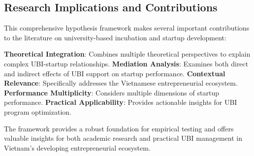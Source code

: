 \documentclass[../Main.tex]{subfiles}
\begin{document}
    \subsection{Research Implications and Contributions}
    This comprehensive hypothesis framework makes several important contributions to the literature on university-based incubation and startup development:

    \textbf{Theoretical Integration}: Combines multiple theoretical perspectives to explain complex UBI-startup relationships. 
    \textbf{Mediation Analysis}: Examines both direct and indirect effects of UBI support on startup performance. 
    \textbf{Contextual Relevance}: Specifically addresses the Vietnamese entrepreneurial ecosystem. 
    \textbf{Performance Multiplicity}: Considers multiple dimensions of startup performance. 
    \textbf{Practical Applicability}: Provides actionable insights for UBI program optimization.

    The framework provides a robust foundation for empirical testing and offers valuable insights for both academic research and practical UBI management in Vietnam's developing entrepreneurial ecosystem.
\end{document}
